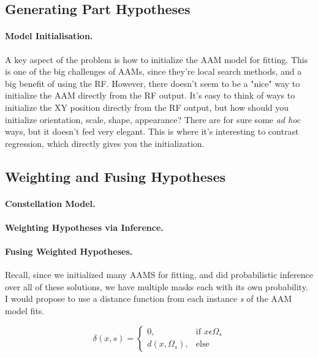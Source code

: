 \documentclass[10pt,twocolumn,letterpaper]{article}
\begin{document}
\subsection{Generating Part Hypotheses}

\paragraph{Model Initialisation. }
%
A key aspect of the problem is how to initialize the AAM model for fitting.  This is one of the big challenges of AAMs, since they're local search methods, and a big benefit of using the RF.  However, there doesn't seem to be a "nice" way to initialize the AAM directly from the RF output.  It's easy to think of ways to initialize the XY position directly from the RF output, but how should you initialize orientation, scale, shape, appearance?  There are for sure some \emph{ad hoc} ways, but it doesn't feel very elegant.  This is where it's interesting to contrast regression, which directly gives you the initialization.

\subsection{Weighting and Fusing Hypotheses}

\paragraph{Constellation Model. }

\paragraph{Weighting Hypotheses via Inference. }

\paragraph{Fusing Weighted Hypotheses. }
Recall, since we initialized many AAMS for fitting, and did probabilistic inference over all of these solutions, we have multiple masks each with its own probability.  I would propose to use a distance function from each instance \emph{s} of the AAM model fits.

\[ \delta (x,s) = \begin{cases} 0, & \mbox{if } x \epsilon \Omega _s \\ d(x, \Omega _s), & \mbox{else} \end{cases} \]
\end{document}
